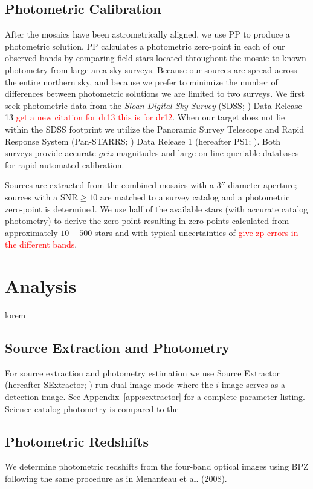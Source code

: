 \documentclass[apj, revtex4]{emulateapj}
\newcommand{\editorial}[1]{\textcolor{red}{#1}}
\begin{document}
\subsection{Photometric Calibration}
After the mosaics have been astrometrically aligned, we use PP to produce a photometric solution. PP calculates a photometric zero-point in each of our observed bands by comparing field stars located throughout the mosaic to known photometry from large-area sky surveys. Because our sources are spread across the entire northern sky, and because we prefer to minimize the number of differences between photometric solutions we are limited to two surveys. We first seek photometric data from the \textit{Sloan Digital Sky Survey} (SDSS; \citealt{York2000}) Data Release 13 \citep{Alam2015} \editorial{get a new citation for dr13 this is for dr12}. When our target does not lie within the SDSS footprint we utilize the Panoramic Survey Telescope and Rapid Response System (Pan-STARRS; \citealt{Chambers2016}) Data Release 1 (hereafter PS1; \citealt{Flewelling2016}). Both surveys provide accurate $griz$ magnitudes and large on-line queriable databases for rapid automated calibration.

Sources are extracted from the combined mosaics with a $3''$ diameter aperture; sources with a SNR$\ge10$ are matched to a survey catalog and a photometric zero-point is determined. We use half of the available stars (with accurate catalog photometry) to derive the zero-point resulting in zero-points calculated from approximately $10-500$ stars and with typical uncertainties of \editorial{give zp errors in the different bands}.

\section{Analysis}\label{sec:analysis}
lorem

\subsection{Source Extraction and Photometry}
For source extraction and photometry estimation we use Source Extractor (hereafter SExtractor; \citealt{Bertin1996}) run dual image mode where the $i$ image serves as a detection image. See Appendix~\ref{app:sextractor} for a complete parameter listing. Science catalog photometry is compared to the 



\subsection{Photometric Redshifts}
We determine photometric redshifts from the four-band optical images using BPZ \citep{Benitez2000} following the same
procedure as in Menanteau et al. (2008).
\end{document}
